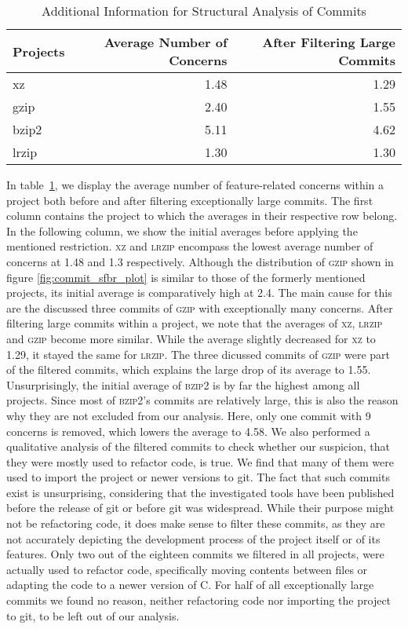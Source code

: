 \begin{table}[t]
\caption{Additional Information for Structural Analysis of Commits}
\label{tab:commit_sfbr_table}
\centering
\begin{tabular}{l r r}
\toprule
\textbf{Projects} & \textbf{Average Number of Concerns} & \textbf{After Filtering Large Commits} \\ 
\midrule
  xz    & 1.48 & 1.29 \\
  gzip  & 2.40 & 1.55 \\
  bzip2 & 5.11 & 4.62 \\
  lrzip & 1.30 & 1.30 \\
\bottomrule
\end{tabular}
\end{table}

In table~\ref{tab:commit_sfbr_table}, we display the average number of feature-related concerns within a project both before and after filtering exceptionally large commits.
The first column contains the project to which the averages ​​in their respective row belong.
In the following column, we show the initial averages before applying the mentioned restriction.
\textsc{xz} and \textsc{lrzip} encompass the lowest average number of concerns at 1.48 and 1.3 respectively.
Although the distribution of \textsc{gzip} shown in figure \ref{fig:commit_sfbr_plot} is similar to those of the formerly mentioned projects, its initial average is comparatively high at 2.4.
The main cause for this are the discussed three commits of \textsc{gzip} with exceptionally many concerns.
After filtering large commits within a project, we note that the averages of \textsc{xz}, \textsc{lrzip} and \textsc{gzip} become more similar.
While the average slightly decreased for \textsc{xz} to 1.29, it stayed the same for \textsc{lrzip}.
The three dicussed commits of \textsc{gzip} were part of the filtered commits, which explains the large drop of its average to 1.55.
Unsurprisingly, the initial average of \textsc{bzip2} is by far the highest among all projects.
Since most of \textsc{bzip2}'s commits are relatively large, this is also the reason why they are not excluded from our analysis. 
Here, only one commit with 9 concerns is removed, which lowers the average to 4.58.
We also performed a qualitative analysis of the filtered commits to check whether our suspicion, that they were mostly used to refactor code, is true.
We find that many of them were used to import the project or newer versions to git.
The fact that such commits exist is unsurprising, considering that the investigated tools have been published before the release of git or before git was widespread.
While their purpose might not be refactoring code, it does make sense to filter these commits, as they are not accurately depicting the development process of the project itself or of its features.
Only two out of the eighteen commits we filtered in all projects, were actually used to refactor code, specifically moving contents between files or adapting the code to a newer version of C.
For half of all exceptionally large commits we found no reason, neither refactoring code nor importing the project to git, to be left out of our analysis.

